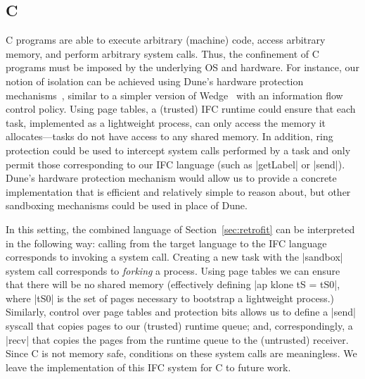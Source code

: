 \subsection{C}
\label{sec:real:c}
%
C programs are able to execute arbitrary (machine) code, access
arbitrary memory, and perform arbitrary system calls.
%
Thus, the confinement of C programs must be imposed by the underlying OS
and hardware.
%
For instance, our notion of isolation can be achieved using Dune's
hardware protection mechanisms~\cite{Belay:2012:DSU:2387880.2387913},
similar to a simpler version of
Wedge~\cite{Belay:2012:DSU:2387880.2387913,
Bittau:2008:WSA:1387589.1387611} with an information flow control
policy.
%
Using page tables, a (trusted) IFC runtime could ensure that each task,
implemented as a lightweight process, can only access the memory it
allocates---tasks do not have access to any shared memory.
%
In addition, ring protection could be used to intercept system
calls performed by
a task and only permit those corresponding to our IFC language (such as
|getLabel| or |send|).
%
Dune's hardware protection mechanism would allow us to provide a concrete
implementation that is efficient and relatively simple to reason
about, but other sandboxing mechanisms could be used in place of Dune.

In this setting, the combined language of Section~\ref{sec:retrofit}
can be interpreted in the following way: calling from the target
language to the IFC language corresponds to invoking a system call.
%
Creating a new task with the |sandbox| system call corresponds to
\emph{forking} a process.  Using page tables we can ensure that
there will be no shared memory
(effectively
defining |ap klone tS
= tS0|, where |tS0| is the set of pages necessary to bootstrap a
lightweight process.)
%
Similarly, control over page tables and protection bits allows us to
define a |send| syscall that copies pages to our
(trusted) runtime queue; and, correspondingly, a |recv| that copies
the pages from the runtime queue to the (untrusted) receiver.
%
Since C is not memory safe, conditions on these system calls are
meaningless.
%
We leave the implementation of this IFC system for C to future work.
